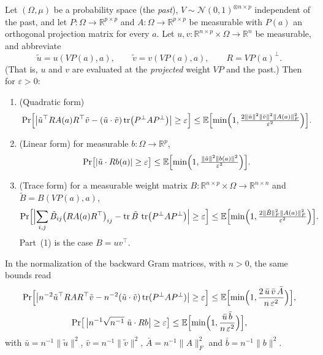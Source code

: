 \begin{theorem}\label{thm:ntkcond:conditionalChebyshev}
  \leanok
Let $(\Omega,\mu)$ be a probability space (the \emph{past}), $V\sim\mathcal N(0,1)^{\otimes n\times p}$ independent of the past, and let $P:\Omega\to\mathbb R^{p\times p}$ and $A:\Omega\to\mathbb R^{p\times p}$ be measurable with $P(a)$ an orthogonal projection matrix for every $a$. Let $u,v:\mathbb R^{n\times p}\times\Omega\to\mathbb R^n$ be measurable, and abbreviate
\[
  \tilde u=u(VP(a),a),\qquad\tilde v=v(VP(a),a),\qquad R=VP(a)^\perp .
\]
(That is, $u$ and $v$ are evaluated at the \emph{projected} weight $VP$ and the past.) Then for $\varepsilon>0$:
\begin{enumerate}
  \item (Quadratic form)
  \[
    \Pr\Bigl[\bigl|\tilde u^\top RA(a)R^\top\tilde v-(\tilde u\cdot\tilde v)\operatorname{tr}\bigl(P^\perp A P^\perp\bigr)\bigr|\ge\varepsilon\Bigr]\le\mathbb E\Bigl[\min\Bigl(1,\tfrac{2\|\tilde u\|^2\|\tilde v\|^2\|A(a)\|_F^2}{\varepsilon^2}\Bigr)\Bigr].
  \]
  \item (Linear form) for measurable $b:\Omega\to\mathbb R^p$,
  \[
    \Pr\bigl[|\tilde u\cdot Rb(a)|\ge\varepsilon\bigr]\le\mathbb E\Bigl[\min\Bigl(1,\tfrac{\|\tilde u\|^2\|b(a)\|^2}{\varepsilon^2}\Bigr)\Bigr].
  \]
  \item (Trace form) for a measurable weight matrix $B:\mathbb R^{n\times p}\times\Omega\to\mathbb R^{n\times n}$ and $\tilde B=B(VP(a),a)$,
  \[
    \Pr\Bigl[\Bigl|\sum_{i,j}\tilde B_{ij}\bigl(RA(a)R^\top\bigr)_{ij}-\operatorname{tr}\tilde B\,\operatorname{tr}\bigl(P^\perp AP^\perp\bigr)\Bigr|\ge\varepsilon\Bigr]\le\mathbb E\Bigl[\min\Bigl(1,\tfrac{2\|\tilde B\|_F^2\|A(a)\|_F^2}{\varepsilon^2}\Bigr)\Bigr].
  \]
  Part~(1) is the case $B=uv^\top$.
\end{enumerate}
In the normalization of the backward Gram matrices, with $n>0$, the same bounds read
\[
  \Pr\Bigl[\bigl|n^{-2}\tilde u^\top RAR^\top\tilde v-n^{-2}(\tilde u\cdot\tilde v)\operatorname{tr}(P^\perp AP^\perp)\bigr|\ge\varepsilon\Bigr]\le\mathbb E\Bigl[\min\Bigl(1,\frac{2\,\bar u\,\bar v\,\bar A}{n\,\varepsilon^2}\Bigr)\Bigr],
\]
\[
  \Pr\bigl[\,\bigl|n^{-1}\sqrt{n^{-1}}\;\tilde u\cdot Rb\bigr|\ge\varepsilon\bigr]\le\mathbb E\Bigl[\min\Bigl(1,\frac{\bar u\,\bar b}{n\,\varepsilon^2}\Bigr)\Bigr],
\]
with $\bar u=n^{-1}\|\tilde u\|^2$, $\bar v=n^{-1}\|\tilde v\|^2$, $\bar A=n^{-1}\|A\|_F^2$ and $\bar b=n^{-1}\|b\|^2$.
\end{theorem}

